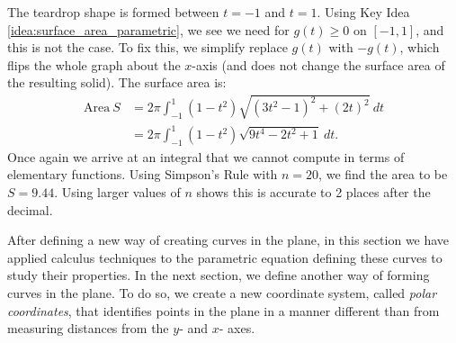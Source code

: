 {The teardrop shape is formed between $t=-1$ and $t=1$. Using Key Idea \ref{idea:surface_area_parametric}, we see we need for $g(t)\geq 0$ on $[-1,1]$, and this is not the case. To fix this, we simplify replace $g(t)$ with $-g(t)$, which flips the whole graph about the $x$-axis (and does not change the surface area of the resulting solid). The surface area is: 
\begin{align*}
\text{Area}\ S &= 2\pi\int_{-1}^1 (1-t^2)\sqrt{(3t^2-1)^2+(2t)^2}\ dt\\
		&=	2\pi\int_{-1}^1 (1-t^2)\sqrt{9t^4-2t^2+1} \ dt.
		\end{align*}
Once again we arrive at an integral that we cannot compute in terms of elementary functions. Using Simpson's Rule with $n=20$, we find the area to be $S=9.44$. Using larger values of $n$ shows this is accurate to 2 places after the decimal.
}

After defining a new way of creating curves in the plane, in this section we have applied calculus techniques to the parametric equation defining these curves to study their properties. In the next section, we define another way of forming curves in the plane. To do so, we create a new coordinate system, called \emph{polar coordinates}, that identifies points in the plane in a manner different than from measuring distances from the $y$- and $x$- axes.

